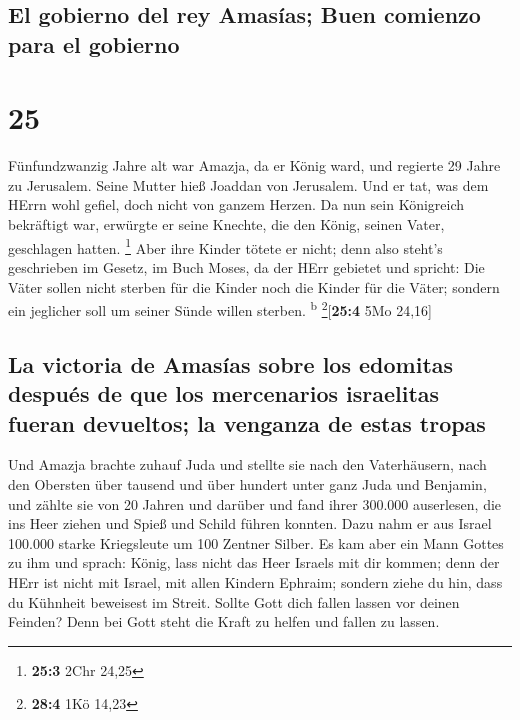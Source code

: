\hypertarget{el-gobierno-del-rey-amasuxedas-buen-comienzo-para-el-gobierno}{%
\subsection{El gobierno del rey Amasías; Buen comienzo para el
gobierno}\label{el-gobierno-del-rey-amasuxedas-buen-comienzo-para-el-gobierno}}

\hypertarget{section-24}{%
\section{25}\label{section-24}}

 Fünfundzwanzig Jahre alt war Amazja, da er König ward,
und regierte 29 Jahre zu Jerusalem. Seine Mutter hieß Joaddan von
Jerusalem.  Und er tat, was dem HErrn wohl gefiel, doch
nicht von ganzem Herzen.  Da nun sein Königreich
bekräftigt war, erwürgte er seine Knechte, die den König, seinen Vater,
geschlagen hatten. \footnote{\textbf{25:3} 2Chr 24,25} 
Aber ihre Kinder tötete er nicht; denn also steht's geschrieben im
Gesetz, im Buch Moses, da der HErr gebietet und spricht: Die Väter
sollen nicht sterben für die Kinder noch die Kinder für die Väter;
sondern ein jeglicher soll um seiner Sünde willen sterben.
\textsuperscript{b} \footnote{\textbf{28:4} 1Kö 14,23}{[}\textbf{25:4}
5Mo 24,16{]}

\hypertarget{la-victoria-de-amasuxedas-sobre-los-edomitas-despuuxe9s-de-que-los-mercenarios-israelitas-fueran-devueltos-la-venganza-de-estas-tropas}{%
\subsection{La victoria de Amasías sobre los edomitas después de que los
mercenarios israelitas fueran devueltos; la venganza de estas
tropas}\label{la-victoria-de-amasuxedas-sobre-los-edomitas-despuuxe9s-de-que-los-mercenarios-israelitas-fueran-devueltos-la-venganza-de-estas-tropas}}

 Und Amazja brachte zuhauf Juda und stellte sie nach den
Vaterhäusern, nach den Obersten über tausend und über hundert unter ganz
Juda und Benjamin, und zählte sie von 20 Jahren und darüber und fand
ihrer 300.000 auserlesen, die ins Heer ziehen und Spieß und Schild
führen konnten.  Dazu nahm er aus Israel 100.000 starke
Kriegsleute um 100 Zentner Silber.  Es kam aber ein Mann
Gottes zu ihm und sprach: König, lass nicht das Heer Israels mit dir
kommen; denn der HErr ist nicht mit Israel, mit allen Kindern Ephraim;
 sondern ziehe du hin, dass du Kühnheit beweisest im
Streit. Sollte Gott dich fallen lassen vor deinen Feinden? Denn bei Gott
steht die Kraft zu helfen und fallen zu lassen.

